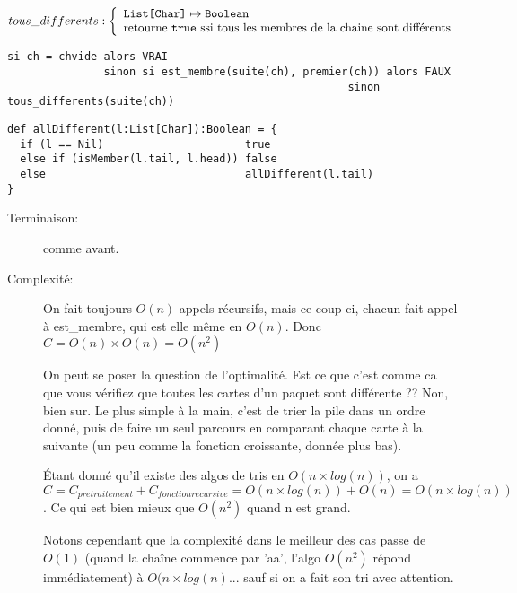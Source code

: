 \documentclass[10pt]{article}\usepackage[nu]{esial}
\begin{document}
\begin{Question}
  $tous\_differents: \left\{
    \begin{array}{l}
      \text{\texttt{List[Char]}}\mapsto \text{\texttt{Boolean}}\\
      \text{retourne \text{\texttt{true}} ssi tous les membres de la chaine sont différents}
    \end{array}\right.$  
\end{Question}
\begin{Reponse}
  \begin{Verbatim}[label=tous\_differents(ch)]
si ch = chvide alors VRAI
               sinon si est_membre(suite(ch), premier(ch)) alors FAUX
                                                     sinon tous_differents(suite(ch))    
  \end{Verbatim}
  \begin{Verbatim}
def allDifferent(l:List[Char]):Boolean = {
  if (l == Nil)                      true
  else if (isMember(l.tail, l.head)) false
  else                               allDifferent(l.tail)
}    
  \end{Verbatim}
  \begin{description}
  \item[Terminaison:] comme avant.
  \item[Complexité:] On fait toujours $O(n)$ appels récursifs, mais ce coup ci,
    chacun fait appel à est\_membre, qui est elle même en $O(n)$. Donc $C =
    O(n)\times O(n) = O(n^2)$

    On peut se poser la question de l'optimalité. Est ce que c'est comme ca que
    vous vérifiez que toutes les cartes d'un paquet sont différente ?? Non,
    bien sur. Le plus simple à la main, c'est de trier la pile dans un ordre
    donné, puis de faire un seul parcours en comparant chaque carte à la
    suivante (un peu comme la fonction croissante, donnée plus bas).

    Étant donné qu'il existe des algos de tris en $O(n\times log(n))$, on a
    $$C = C_{pretraitement}+C_{fonction recursive}= O(n\times log(n)) + O(n) =
    O(n\times log(n))$$. Ce qui est bien mieux que $O(n^2)$ quand n est grand.

    Notons cependant que la complexité dans le meilleur des cas passe de $O(1)$
    (quand la chaîne commence par 'aa', l'algo $O(n^2)$ répond immédiatement) à
    $O(n\times log(n)$... sauf si on a fait son tri avec attention.
  \end{description}
\end{Reponse}
\end{document}
